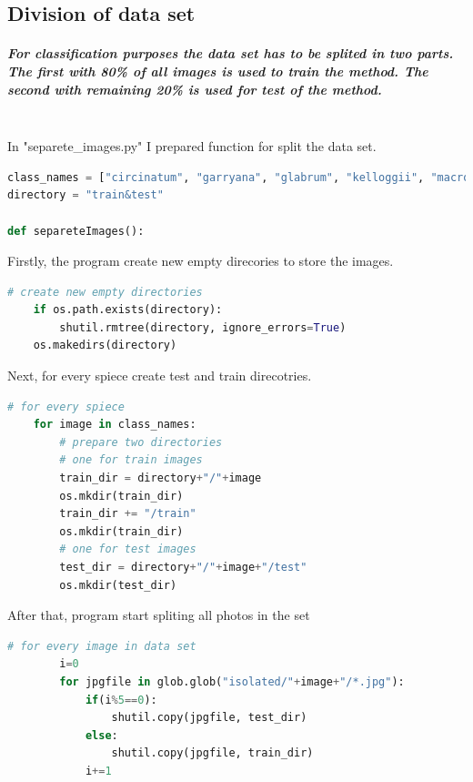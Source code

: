 \documentclass[12pt]{article}
\begin{document}
\subsection{Division of data set}

\subparagraph{
For classification purposes the data set has to be splited in two parts. The first with 80\% of all images is used to train the method. The second with remaining 20\% is used for test of the method. \\\\
}

In "separete\_images.py" I prepared function for split the data set. 

\begin{lstlisting}[language=Python]
class_names = ["circinatum", "garryana", "glabrum", "kelloggii", "macrophyllum","negundo"]
directory = "train&test"

def separeteImages():
\end{lstlisting} 

Firstly, the program create new empty direcories to store the images.

\begin{lstlisting}[language=Python]
 # create new empty directories
    if os.path.exists(directory):
        shutil.rmtree(directory, ignore_errors=True)
    os.makedirs(directory)
\end{lstlisting} 

Next, for every spiece create test and train direcotries.

\begin{lstlisting}[language=Python]
  # for every spiece
    for image in class_names:
        # prepare two directories 
        # one for train images
        train_dir = directory+"/"+image
        os.mkdir(train_dir)
        train_dir += "/train"
        os.mkdir(train_dir)
        # one for test images
        test_dir = directory+"/"+image+"/test"
        os.mkdir(test_dir)
\end{lstlisting} 

After that, program start spliting all photos in the set

\begin{lstlisting}[language=Python]
        # for every image in data set
        i=0
        for jpgfile in glob.glob("isolated/"+image+"/*.jpg"):
            if(i%5==0):
                shutil.copy(jpgfile, test_dir)
            else:
                shutil.copy(jpgfile, train_dir)
            i+=1
\end{lstlisting} 
\end{document}
